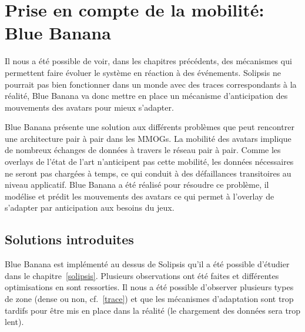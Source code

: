 \section{Prise en compte de la mobilité: Blue Banana}
	\label{BlueBanana}
	Il nous a été possible de voir, dans les chapitres précédents, des mécanismes qui permettent faire évoluer le système en réaction à des événements. Solipsis ne pourrait pas bien fonctionner dans un monde avec des traces correspondants à la réalité, Blue Banana va donc mettre en place un mécanisme d'anticipation des mouvements des avatars pour mieux s'adapter.
	\par Blue Banana présente une solution aux différents problèmes que peut rencontrer une architecture pair à pair dans les MMOGs. La mobilité des avatars implique de nombreux échanges de données à travers le réseau pair à pair. Comme les overlays de l'état de l'art n'anticipent pas cette mobilité, les données nécessaires ne seront pas chargées à temps, ce qui conduit à des défaillances transitoires au niveau applicatif. Blue Banana a été réalisé pour résoudre ce problème, il modélise et prédit les mouvements des avatars ce qui permet à l'overlay de s'adapter par anticipation aux besoins du jeux.
	\subsection{Solutions introduites}
	Blue Banana est implémenté au dessus de Solipsis qu'il a été possible d'étudier dans le chapitre~\ref{solipsis}. Plusieurs observations ont été faites et différentes optimisations en sont ressorties. Il nous a été possible d'observer plusieurs types de zone (dense ou non, cf.~\ref{trace}) et que les mécanismes d'adaptation sont trop tardifs pour être mis en place dans la réalité (le chargement des données sera trop lent).
